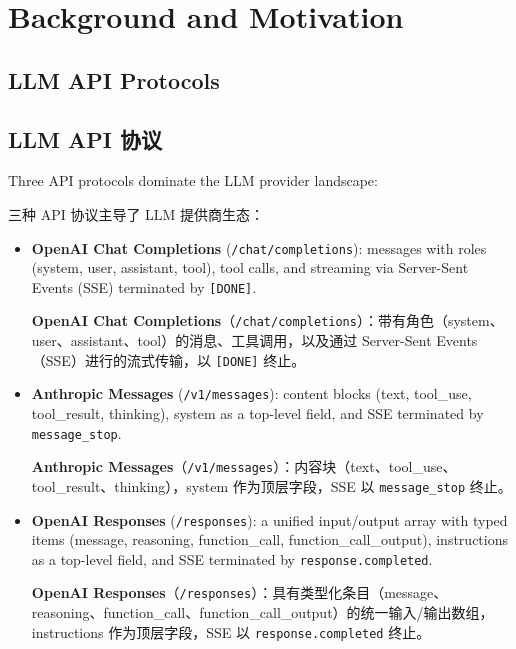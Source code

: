 \section{Background and Motivation}
\label{sec:bg}

\subsection{LLM API Protocols}
\begin{chinese}
\subsection{LLM API 协议}
\end{chinese}

Three API protocols dominate the LLM provider landscape:
\begin{chinese}
三种 API 协议主导了 LLM 提供商生态：
\end{chinese}

\begin{itemize}[nosep]
    \item \textbf{OpenAI Chat Completions} (\texttt{/chat/completions}): messages with roles (system, user, assistant, tool), tool calls, and streaming via Server-Sent Events (SSE) terminated by \texttt{[DONE]}.
    \begin{chinese}
    \textbf{OpenAI Chat Completions}（\texttt{/chat/completions}）：带有角色（system、user、assistant、tool）的消息、工具调用，以及通过 Server-Sent Events（SSE）进行的流式传输，以 \texttt{[DONE]} 终止。
    \end{chinese}
    \item \textbf{Anthropic Messages} (\texttt{/v1/messages}): content blocks (text, tool\_use, tool\_result, thinking), system as a top-level field, and SSE terminated by \texttt{message\_stop}.
    \begin{chinese}
    \textbf{Anthropic Messages}（\texttt{/v1/messages}）：内容块（text、tool\_use、tool\_result、thinking），system 作为顶层字段，SSE 以 \texttt{message\_stop} 终止。
    \end{chinese}
    \item \textbf{OpenAI Responses} (\texttt{/responses}): a unified input/output array with typed items (message, reasoning, function\_call, function\_call\_output), instructions as a top-level field, and SSE terminated by \texttt{response.completed}.
    \begin{chinese}
    \textbf{OpenAI Responses}（\texttt{/responses}）：具有类型化条目（message、reasoning、function\_call、function\_call\_output）的统一输入/输出数组，instructions 作为顶层字段，SSE 以 \texttt{response.completed} 终止。
    \end{chinese}
\end{itemize}

